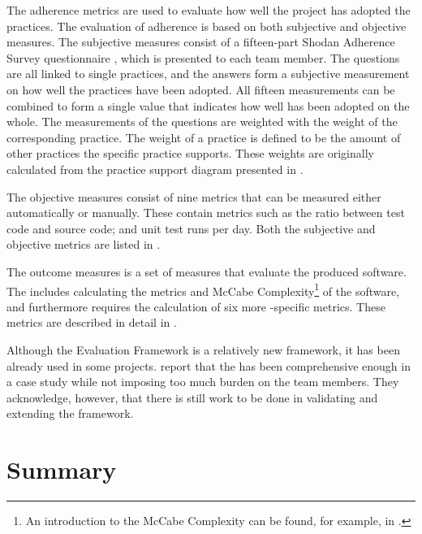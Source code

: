 The  adherence metrics are used to evaluate how well the 
project has adopted the  practices. The evaluation of 
adherence is based on both subjective and objective measures. The 
subjective measures consist of a fifteen-part Shodan Adherence Survey 
questionnaire \citep{xpevaluationfw}, which is presented to each team 
member. The questions are all linked to single  practices, 
and the answers form a subjective measurement on how well the 
practices have been adopted. All fifteen measurements can be combined 
to form a single value that indicates how well  has been 
adopted on the whole. The measurements of the questions are weighted 
with the weight of the corresponding  practice. The weight 
of a practice is defined to be the amount of other  
practices the specific practice supports. These weights are originally 
calculated from the  practice support diagram presented in 
\citep{xpexplained}.

The objective measures consist of nine metrics that can be measured 
either automatically or manually. These contain metrics such as the 
ratio between test code and source code; and unit test runs per day. 
Both the subjective and objective metrics are listed in 
\citep{xpevaluationfw}.

The  outcome measures is a set of measures that evaluate 
the produced software. The  includes calculating the 
 metrics and McCabe Complexity\footnote{An introduction to 
the McCabe Complexity can be found, for example, in \citep{mccabe}.} 
of the software, and furthermore requires the calculation of six more 
-specific metrics. These metrics are described in detail in 
\citep{xpevaluationfw}.

Although the  Evaluation Framework is a relatively new 
framework, it has been already used in some projects. 
\cite{evaluatingxp} report that the  has been 
comprehensive enough in a case study while not imposing too much 
burden on the team members. They acknowledge, however, that there is 
still work to be done in validating and extending the framework.


\section{Summary}
\label{toc:evaluation:summary}

